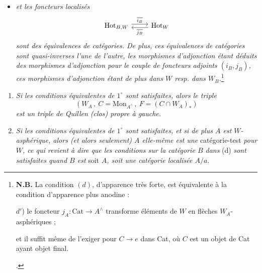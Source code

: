 \documentclass[11pt]{article}
\newcommand{\printedpage}[1]{\marginpar{\raggedright\footnotesize p.~#1}}
\newcommand{\msp}[1]{\marginpar{\raggedright\footnotesize [#1]}}
\begin{document}
\printedpage{59}

\begin{itemize}[label={},leftmargin=4.5em]
\item \textit{et les foncteurs localisés}
\[
\begin{tikzcd}
\mathrm{Hot}_{B,W} \arrow[r, shift left, "\overline{i_B}"] & \mathrm{Hot}_W \arrow[l, shift left, "\overline{j_B}"]
\end{tikzcd}
\]
\textit{sont des équivalences de catégories. De plus, ces équivalences de catégories sont quasi-inverses l'une de l'autre, les morphismes d'adjonction étant déduits des morphismes d'adjonction pour le couple de foncteurs adjoints $(i_B, j_B)$, ces morphismes d'adjonction étant de plus dans $W$ resp. dans $W_B$.}\footnote[38]{\textbf{N.B.} La condition $(d)$, d'apparence très forte, est équivalente à la condition d'apparence plus anodine :\par
$d'$) le foncteur $j_A : \mathrm{Cat} \longrightarrow A^\wedge$ transforme éléments de $W$ en flèches $W_A$-asphériques ;\par\noindent
et il suffit même de l'exiger pour $C \longrightarrow e$ dans Cat, où $C$ est un objet de Cat ayant objet final.\par\noindent
.}
\end{itemize}

\msp{page 107}

\begin{enumerate}[leftmargin=2.5em]
\item[$2^\circ$)] \textit{Si les conditions équivalentes de $1^\circ$ sont satisfaites, alors le triple}
\[
(W_A\,,\ C = \mathrm{Mon}_{A^\wedge}\,,\ F = (C \cap W_A)_*)
\]
\textit{est un triple de Quillen (clos) propre à gauche.}
\item[$3^\circ$)] \textit{Si les conditions équivalentes de $1^\circ$ sont satisfaites, et si de plus $A$ est $W$-asphérique, alors (et alors seulement) $A$ elle-même est une} catégorie-test \textit{pour $W$, ce qui revient à dire que les conditions sur la catégorie $B$ dans} (d) \textit{sont satisfaites quand $B$ est} soit \textit{$A$, soit une catégorie localisée $A/a$.}
\end{enumerate}
\end{document}
